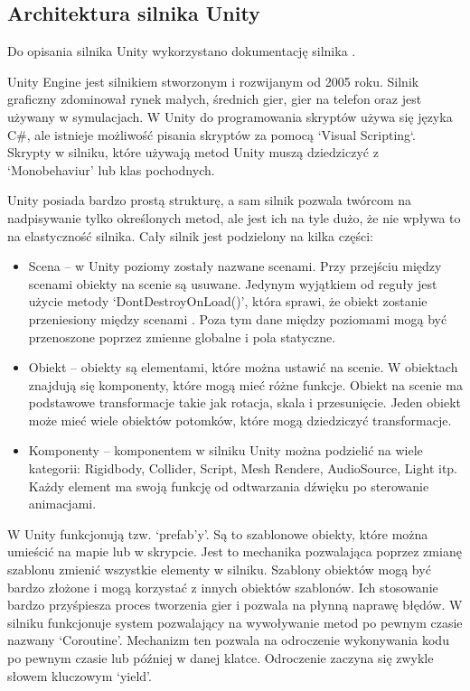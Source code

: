\documentclass[12pt,twoside]{article}
\begin{document}
\clearpage

\subsection{Architektura silnika Unity}
Do opisania silnika Unity wykorzystano dokumentację silnika \cite{Unity:Documentatnion}.

Unity Engine jest silnikiem stworzonym i rozwijanym od 2005 roku. Silnik
graficzny zdominował rynek małych, średnich gier, gier na telefon oraz jest
używany w symulacjach. W Unity do programowania skryptów używa się języka C\#,
ale istnieje możliwość pisania skryptów za pomocą `Visual Scripting`. Skrypty w
silniku, które używają metod Unity muszą dziedziczyć z ‘Monobehaviur’ lub klas
pochodnych. 

Unity posiada bardzo prostą strukturę, a sam silnik pozwala twórcom na
nadpisywanie tylko określonych metod, ale jest ich na tyle dużo, że nie wpływa
to na elastyczność silnika. Cały silnik jest podzielony na kilka
części: 
\begin{itemize}
\item Scena – w Unity poziomy zostały nazwane scenami. Przy przejściu między
scenami obiekty na scenie są usuwane. Jedynym wyjątkiem od reguły jest użycie
metody ‘DontDestroyOnLoad()’, która sprawi, że obiekt zostanie przeniesiony
między scenami \cite{Unity:DonSaveOnLoad}. Poza tym dane między poziomami mogą być przenoszone poprzez
zmienne globalne i pola statyczne\cite{Unity:Scena}.
\item Obiekt – obiekty są elementami, które można ustawić na scenie. W obiektach
znajdują się komponenty, które mogą mieć różne funkcje. Obiekt na scenie ma
podstawowe transformacje takie jak rotacja, skala i przesunięcie. Jeden obiekt
może mieć wiele obiektów potomków, które mogą dziedziczyć transformacje\cite{Unity:Obiekt}. 
\item Komponenty – komponentem w silniku Unity można podzielić na wiele
kategorii: Rigidbody, Collider, Script, Mesh Rendere, AudioSource, Light itp.
Każdy element ma swoją funkcję od odtwarzania dźwięku po sterowanie animacjami. 
\end{itemize}
W Unity funkcjonują tzw. ‘prefab'y’. Są to szablonowe obiekty, które można
umieścić na mapie lub w skrypcie. Jest to mechanika pozwalająca poprzez zmianę
szablonu zmienić wszystkie elementy w silniku. Szablony obiektów mogą być bardzo
złożone i mogą korzystać z innych obiektów szablonów. Ich stosowanie bardzo
przyśpiesza proces tworzenia gier i pozwala na płynną naprawę błędów. W silniku
funkcjonuje system pozwalający na wywoływanie metod po pewnym czasie nazwany
‘Coroutine’. Mechanizm ten pozwala na odroczenie wykonywania kodu po pewnym
czasie lub później w danej klatce. Odroczenie zaczyna się zwykle słowem
kluczowym ‘yield’.  
\end{document}

